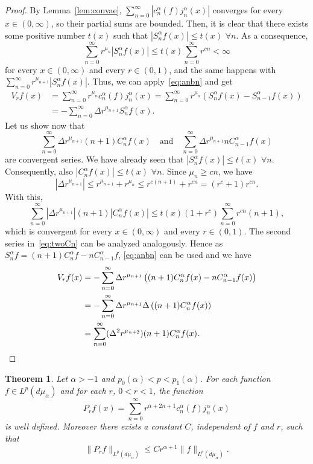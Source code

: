 \documentclass[11pt,a4paper]{amsart}
\newcommand{\mua}{d\mu_\alpha}
\newcommand{\jna}{j_n^{\alpha}}
\newcommand{\cna}{c_n^{\alpha}}
\newcommand{\Sna}{S_n^{\alpha}}
\newcommand{\lpnorm}[3]{\|{#1}\|_{L^{#2}({#3})}} %
\theoremstyle{plain}
\newtheorem{theor}{Theorem}
\theoremstyle{remark}
\begin{document}
\begin{proof}
By Lemma~\ref{lem:convae}, $\sum_{n=0}^\infty |\cna(f) \jna(x)|$ converges for every $x \in (0,\infty)$, so their partial sums are bounded. Then, it is clear that there exists some positive number $t(x)$ such that $|\Sna f(x)| \le t(x)$ $\forall n$. As a consequence,
\[
  \sum_{n=0}^\infty r^{\mu_n} |\Sna f(x)|
  \le t(x) \sum_{n=0}^\infty r^{cn} < \infty
\]
for every $x \in (0,\infty)$ and every $r \in (0,1)$, and the same happens
with $\sum_{n=0}^\infty r^{\mu_{n+1}} |\Sna f(x)|$.
Thus, we can apply~\eqref{eq:anbn} and get 
\begin{align*}
  V_r f(x) &= \sum_{n=0}^\infty r^{\mu_n} \cna(f) \jna(x)
  = \sum_{n=0}^\infty r^{\mu_n} (S_n^\alpha f(x) - S_{n-1}^\alpha f(x)) \\
  &= - \sum_{n=0}^\infty \Delta r^{\mu_{n+1}} \Sna f(x).
\end{align*}
Let us show now that 
\begin{equation}
\label{eq:twoCn}
  \sum_{n=0}^\infty \Delta r^{\mu_{n+1}} (n+1) C_n^\alpha f(x)
\quad
\text{and}
\quad
  \sum_{n=0}^\infty \Delta r^{\mu_{n+1}} n C_{n-1}^\alpha f(x)
\end{equation}
are convergent series. We have already seen that $|\Sna f(x)| \le t(x)$ $\forall n$. Consequently, also $|C_n^\alpha f(x)| \le t(x)$ $\forall n$. Since $\mu_n \ge cn$, we have
\[
  |\Delta r^{\mu_{n+1}}| \le r^{\mu_{n+1}} + r^{\mu_n}
  \le r^{c(n+1)} + r^{cn} = (r^c + 1) r^{cn}.
\]
With this, 
\[
  \sum_{n=0}^\infty |\Delta r^{\mu_{n+1}}| (n+1) |C_n^\alpha f(x)|
  \le t(x) (1+r^c) \sum_{n=0}^\infty r^{cn} (n+1),
\]
which is convergent for every $x \in (0,\infty)$ and every $r \in (0,1)$.
The second series in~\eqref{eq:twoCn} can be analyzed analogously.
Hence as $\Sna f = (n+1) C_n^\alpha f - n C_{n-1}^\alpha f$,
\eqref{eq:anbn} can be used and we have
\begin{align*}
  V_r f(x) &= - \sum_{n=0}^\infty \Delta r^{\mu_{n+1}}
    \left( (n+1) C_n^\alpha f(x) - n C_{n-1}^\alpha f(x) \right) \\
  &= - \sum_{n=0}^\infty \Delta r^{\mu_{n+1}}
    \Delta\left( (n+1) C_n^\alpha f(x)\right) \\
  &= \sum_{n=0}^\infty (\Delta^2 r^{\mu_{n+2}}) (n+1) C_n^\alpha f(x).
  \qedhere
\end{align*}
\end{proof}

\begin{theor}
\label{th:Poisson}
Let $\alpha > -1$ and $p_0(\alpha) < p < p_1(\alpha)$.
For each function $f\in L^p(\mua)$ and for each $r$, $0<r<1$,
the function
\[
  P_r f(x) = \sum_{n=0}^\infty r^{\alpha+2n+1} \cna(f) \jna(x)
\]
is well defined. 
Moreover there exists a constant $C$, independent of $f$ and $r$, such that
\[
  \lpnorm{P_r f}{p}{\mua} \le C r^{\alpha+1} \lpnorm{f}{p}{\mua}.
\]
\end{theor}
\end{document}
